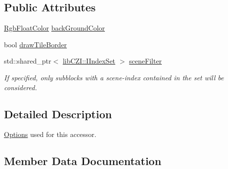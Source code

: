 \subsection*{Public Attributes}
\begin{DoxyCompactItemize}
\item 
\hyperlink{structlib_c_z_i_1_1_rgb_float_color}{Rgb\+Float\+Color} \hyperlink{structlib_c_z_i_1_1_i_single_channel_scaling_tile_accessor_1_1_options_a2d62a4b7e8dd4edc3d4419c2dc3e4901}{back\+Ground\+Color}
\item 
bool \hyperlink{structlib_c_z_i_1_1_i_single_channel_scaling_tile_accessor_1_1_options_ad0ff6bfe4369dd315edc4cfca9747596}{draw\+Tile\+Border}
\item 
\mbox{\label{structlib_c_z_i_1_1_i_single_channel_scaling_tile_accessor_1_1_options_a8cede93cd20a293ccf34354813779d41}} 
std\+::shared\+\_\+ptr$<$ \hyperlink{classlib_c_z_i_1_1_i_index_set}{lib\+C\+Z\+I\+::\+I\+Index\+Set} $>$ \hyperlink{structlib_c_z_i_1_1_i_single_channel_scaling_tile_accessor_1_1_options_a8cede93cd20a293ccf34354813779d41}{scene\+Filter}
\begin{DoxyCompactList}\small\item\em If specified, only subblocks with a scene-\/index contained in the set will be considered. \end{DoxyCompactList}\end{DoxyCompactItemize}


\subsection{Detailed Description}
\hyperlink{structlib_c_z_i_1_1_i_single_channel_scaling_tile_accessor_1_1_options}{Options} used for this accessor. 

\subsection{Member Data Documentation}
\mbox{\label{structlib_c_z_i_1_1_i_single_channel_scaling_tile_accessor_1_1_options_a2d62a4b7e8dd4edc3d4419c2dc3e4901}} 
